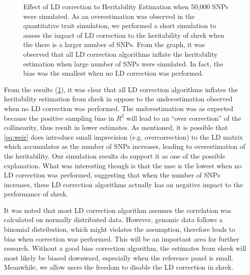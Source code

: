 \begin{figure}[t]
{			\label{fig:bigvarLDCor}
		}
		\caption[Effect of LD correction to Heritability Estimation with 50,000 SNPs]
		{Effect of LD correction to Heritability Estimation when 50,000 \glspl{SNP} were simulated.
			As an overestimation was observed in the quantitative trait simulation, we performed a short simulation to assess the impact of \gls{LD} correction to the heritability of \gls{shrek} when the there is a larger number of \glspl{SNP}.
			From the graph, it was observed that all \gls{LD} correction algorithms inflate the heritability estimation when large number of \glspl{SNP} were simulated.
			In fact, the bias was the smallest when no \gls{LD} correction was performed. 
		} 
		\label{fig:ldCorBigCom}
	\end{figure}
	
	From the results (\cref{fig:ldCorBigCom}), it was clear that all \gls{LD} correction algorithms inflates the heritability estimation from \gls{shrek} in oppose to the underestimation observed when no \gls{LD} correction was performed.
	The underestimation was as expected because the positive sampling bias in $R^2$ will lead to an ``over correction'' of the collinearity, thus result in lower estimates.
	As mentioned, it is possible that \cref{eq:weir} does introduce small imprecision (e.g. overcorrection) to the \gls{LD} matrix which accumulates as the number of \glspl{SNP} increases, leading to overestimation of the heritability.
	Our simulation results do support it as one of the possible explanation. 
	What was interesting though is that the \gls{mse} is the lowest when no \gls{LD} correction was performed, suggesting that when the number of \glspl{SNP} increases, these \gls{LD} correction algorithms actually has an negative impact to the performance of \gls{shrek}.
	
	It was noted that most \gls{LD} correction algorithm assumes the correlation was calculated on normally distributed data. 
	However, genomic data follows a binomial distribution, which might violates the assumption, therefore leads to bias when correction was performed.
	This will be an important area for further research.
	Without a good bias correction algorithm, the estimates from \gls{shrek} will most likely be biased downward, especially when the reference panel is small.
	Meanwhile, we allow users the freedom to disable the \gls{LD} correction in \gls{shrek}.
	
